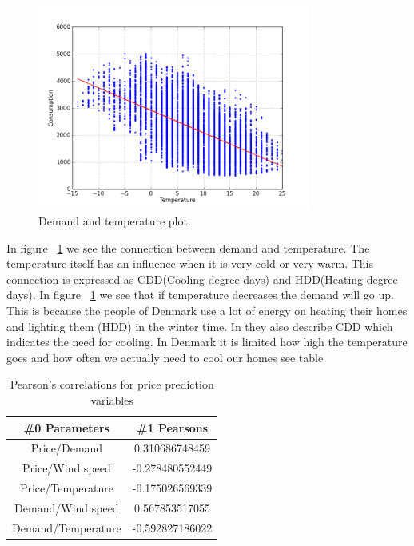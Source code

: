 \begin{figure}[H]
\centering
\includegraphics[width=0.8\textwidth ,natwidth=410,natheight=237]{billeder/energy_price_plots/consump_temp.png}
\caption{Demand and temperature plot.}
\label{fig:consump_temp}
\end{figure}


In figure ~\ref{fig:consump_temp} we see the connection between demand and temperature. The temperature itself has an influence when it is very cold or very warm. This connection is expressed as CDD(Cooling degree days) and HDD(Heating degree days). In figure ~\ref{fig:consump_temp} we see that if temperature decreases the demand will go up. This is because the people of Denmark use a lot of energy on heating their homes and lighting them (HDD) in the winter time. In \cite{19} they also describe CDD which indicates the need for cooling. In Denmark it is limited how high the temperature goes and how often we actually need to cool our homes see table 

\begin{table}[!ht]
\centering  %
\begin{tabular}{c c} %
 \#0 Parameters & \#1 Pearsons \\ [0.5ex] %
\hline                  %
Price/Demand & 0.310686748459 \\
Price/Wind speed & -0.278480552449  \\
Price/Temperature & -0.175026569339 \\
Demand/Wind speed & 0.567853517055 \\
Demand/Temperature & -0.592827186022 \\
\hline %
\end{tabular}
\caption{Pearson's correlations for price prediction variables} %
\label{table:pearsonsPriceVariables} %
\end{table}

